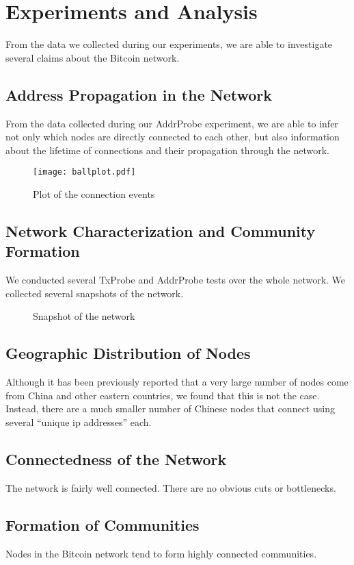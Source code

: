 \section{Experiments and Analysis}

From the data we collected during our experiments, we are able to investigate several claims about the Bitcoin network.

\subsection{Address Propagation in the Network}
From the data collected during our AddrProbe experiment, we are able to infer not only which nodes are directly connected to each other, but also information about the lifetime of connections and their propagation through the network.

\begin{figure*}
\centering
\texttt{[image: ballplot.pdf]}
\caption{Plot of the connection events}
\end{figure*}


\subsection{Network Characterization and Community Formation}
We conducted several TxProbe and AddrProbe tests over the whole network.
We collected several snapshots of the network.
\begin{figure*}
\centering
\caption{Snapshot of the network}
\end{figure*}


\subsection{Geographic Distribution of Nodes}
Although it has been previously reported that a very large number of nodes come from China and other eastern countries, we found that this is not the case. Instead, there are a much smaller number of Chinese nodes that connect using several ``unique ip addresses'' each.

\subsection{Connectedness of the Network}
The network is fairly well connected. There are no obvious cuts or bottlenecks.

\subsection{Formation of Communities}
Nodes in the Bitcoin network tend to form highly connected communities. 


